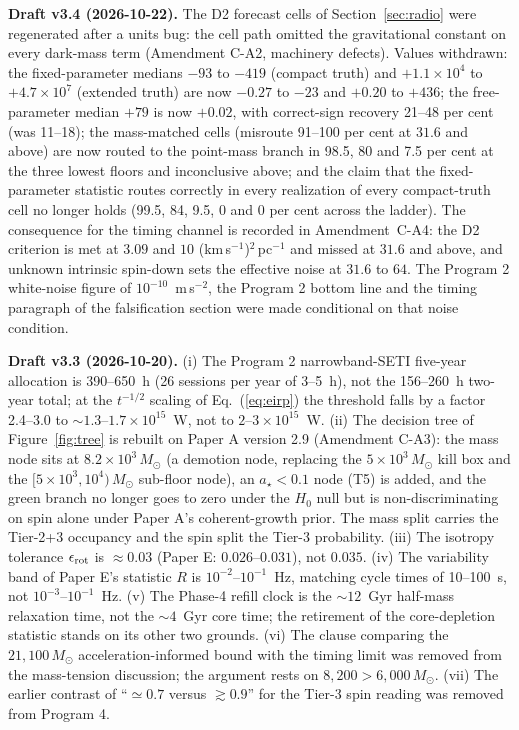 \documentclass[11pt]{article}
\newcommand{\msun}{\ensuremath{M_\odot}}
\newcommand{\astar}{\ensuremath{a_\star}}
\begin{document}
\textbf{Draft v3.4 (2026-10-22).} The D2 forecast cells of Section~\ref{sec:radio} were regenerated after a units bug: the cell path omitted the gravitational constant on every dark-mass term (Amendment C-A2, machinery defects). Values withdrawn: the fixed-parameter medians $-93$ to $-419$ (compact truth) and $+1.1\times10^{4}$ to $+4.7\times10^{7}$ (extended truth) are now $-0.27$ to $-23$ and $+0.20$ to $+436$; the free-parameter median $+79$ is now $+0.02$, with correct-sign recovery 21--48 per cent (was 11--18); the mass-matched cells (misroute 91--100 per cent at $31.6$ and above) are now routed to the point-mass branch in 98.5, 80 and 7.5 per cent at the three lowest floors and inconclusive above; and the claim that the fixed-parameter statistic routes correctly in every realization of every compact-truth cell no longer holds (99.5, 84, 9.5, 0 and 0 per cent across the ladder). The consequence for the timing channel is recorded in Amendment~C-A4: the D2 criterion is met at $3.09$ and $10$ (km\,s$^{-1}$)$^{2}$\,pc$^{-1}$ and missed at $31.6$ and above, and unknown intrinsic spin-down sets the effective noise at $31.6$ to $64$. The Program 2 white-noise figure of $10^{-10}$~m\,s$^{-2}$, the Program 2 bottom line and the timing paragraph of the falsification section were made conditional on that noise condition.

\textbf{Draft v3.3 (2026-10-20).} (i) The Program 2 narrowband-SETI five-year allocation is 390--650~h (26 sessions per year of 3--5~h), not the 156--260~h two-year total; at the $t^{-1/2}$ scaling of Eq.~(\ref{eq:eirp}) the threshold falls by a factor 2.4--3.0 to $\sim 1.3$--$1.7\times10^{15}$~W, not to $2$--$3\times10^{15}$~W. (ii) The decision tree of Figure~\ref{fig:tree} is rebuilt on Paper A version 2.9 (Amendment C-A3): the mass node sits at $8.2\times10^{3}\,\msun$ (a demotion node, replacing the $5\times10^{3}\,\msun$ kill box and the $[5\times10^{3},10^{4})\,\msun$ sub-floor node), an $\astar < 0.1$ node (T5) is added, and the green branch no longer goes to zero under the $H_0$ null but is non-discriminating on spin alone under Paper A's coherent-growth prior. The mass split carries the Tier-2+3 occupancy and the spin split the Tier-3 probability. (iii) The isotropy tolerance $\epsilon_{\rm rot}$ is $\approx 0.03$ (Paper E: $0.026$--$0.031$), not $0.035$. (iv) The variability band of Paper E's statistic $R$ is $10^{-2}$--$10^{-1}$~Hz, matching cycle times of 10--100~s, not $10^{-3}$--$10^{-1}$~Hz. (v) The Phase-4 refill clock is the $\sim 12$~Gyr half-mass relaxation time, not the $\sim 4$~Gyr core time; the retirement of the core-depletion statistic stands on its other two grounds. (vi) The clause comparing the $21{,}100\,\msun$ acceleration-informed bound with the timing limit was removed from the mass-tension discussion; the argument rests on $8{,}200 > 6{,}000\,\msun$. (vii) The earlier contrast of ``$\simeq 0.7$ versus $\gtrsim 0.9$'' for the Tier-3 spin reading was removed from Program 4.
\end{document}
